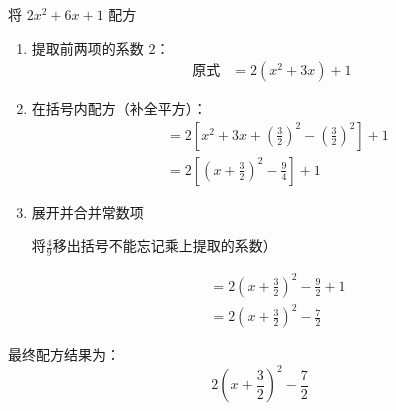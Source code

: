 \documentclass[lang=cn, 10pt, titlestyle=display, oneside, toc=twocol]{elegantbook}
\begin{document}
\par
\begin{example}
    将 \(2x^2 + 6x+1\) 配方
\end{example}
\begin{solution}
\begin{enumerate}
    \item 提取前两项的系数 \(2\)：
    \begin{align*}
    \text{原式} &= 2\left(x^2 + 3x\right) + 1
    \end{align*}

    \item 在括号内配方（补全平方）：
    \begin{align*}
    &= 2\left[x^2 + 3x + \left(\frac{3}{2}\right)^2 - \left(\frac{3}{2}\right)^2\right] + 1\\
    &=2\left[\left(x + \frac{3}{2}\right)^2 - \frac{9}{4}\right] + 1
    \end{align*}

    \item 展开并合并常数项
    \begin{remark}
    将\(\frac{4}{9}\)移出括号不能忘记乘上提取的系数）
    \end{remark}
    \begin{align*}
    &=2\left(x + \frac{3}{2}\right)^2 - \frac{9}{2} + 1 \\
    &= 2\left(x + \frac{3}{2}\right)^2 - \frac{7}{2}
    \end{align*}
\end{enumerate}

最终配方结果为：
\[
2\left(x + \frac{3}{2}\right)^2 - \frac{7}{2}
\]

\end{solution}
\end{document}
